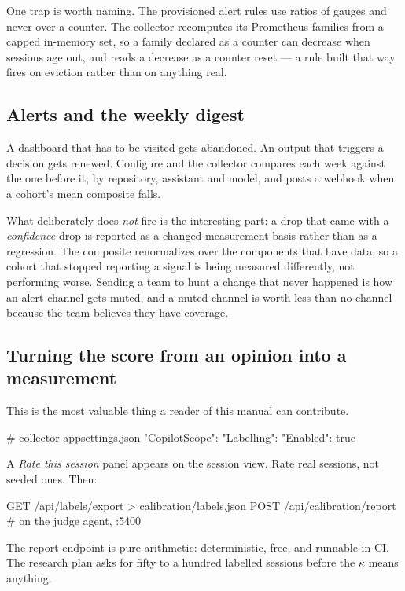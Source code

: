 \documentclass[11pt,a4paper]{article}
\newcommand{\code}[1]{\texttt{\detokenize{#1}}}
\begin{document}
One trap is worth naming. The provisioned alert rules use ratios of gauges and
never \code{rate()} over a counter. The collector recomputes its Prometheus
families from a capped in-memory set, so a family declared as a counter can
decrease when sessions age out, and \code{rate()} reads a decrease as a counter
reset --- a rule built that way fires on eviction rather than on anything real.

\subsection{Alerts and the weekly digest}

A dashboard that has to be visited gets abandoned. An output that triggers a
decision gets renewed. Configure \code{CopilotScope:Alerts} and the collector
compares each week against the one before it, by repository, assistant and
model, and posts a webhook when a cohort's mean composite falls.

What deliberately does \emph{not} fire is the interesting part: a drop that came
with a \emph{confidence} drop is reported as a changed measurement basis rather
than as a regression. The composite renormalizes over the components that have
data, so a cohort that stopped reporting a signal is being measured differently,
not performing worse. Sending a team to hunt a change that never happened is how
an alert channel gets muted, and a muted channel is worth less than no channel
because the team believes they have coverage.

\subsection{Turning the score from an opinion into a measurement}

This is the most valuable thing a reader of this manual can contribute.

\begin{shell}
# collector appsettings.json
"CopilotScope": { "Labelling": { "Enabled": true } }
\end{shell}

A \emph{Rate this session} panel appears on the session view. Rate real
sessions, not seeded ones. Then:

\begin{shell}
GET /api/labels/export > calibration/labels.json
POST /api/calibration/report   # on the judge agent, :5400
\end{shell}

The report endpoint is pure arithmetic: deterministic, free, and runnable in CI.
The research plan asks for fifty to a hundred labelled sessions before the
$\kappa$ means anything.
\end{document}
